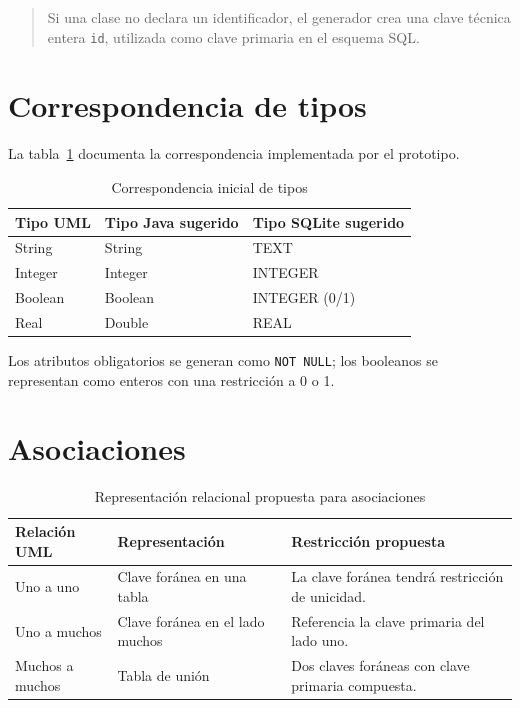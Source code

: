 \documentclass[12pt,a4paper,oneside]{report}
\begin{document}
\begin{quote}
Si una clase no declara un identificador, el generador crea una clave técnica entera \texttt{id}, utilizada como clave primaria en el esquema SQL.
\end{quote}

\section{Correspondencia de tipos}
La tabla~\ref{tab:tipos} documenta la correspondencia implementada por el prototipo.

\begin{table}[H]
\centering
\caption{Correspondencia inicial de tipos}
\label{tab:tipos}
\begin{tabular}{lll}
\toprule
\textbf{Tipo UML} & \textbf{Tipo Java sugerido} & \textbf{Tipo SQLite sugerido}\\
\midrule
String & String & TEXT\\
Integer & Integer & INTEGER\\
Boolean & Boolean & INTEGER (0/1)\\
Real & Double & REAL\\
\bottomrule
\end{tabular}
\end{table}

Los atributos obligatorios se generan como \texttt{NOT NULL}; los booleanos se representan como enteros con una restricción a 0 o 1.

\section{Asociaciones}
\begin{table}[H]
\centering
\caption{Representación relacional propuesta para asociaciones}
\label{tab:asociaciones}
\begin{tabularx}{\textwidth}{l l X}
\toprule
\textbf{Relación UML} & \textbf{Representación} & \textbf{Restricción propuesta}\\
\midrule
Uno a uno & Clave foránea en una tabla & La clave foránea tendrá restricción de unicidad.\\
Uno a muchos & Clave foránea en el lado muchos & Referencia la clave primaria del lado uno.\\
Muchos a muchos & Tabla de unión & Dos claves foráneas con clave primaria compuesta.\\
\bottomrule
\end{tabularx}
\end{table}
\end{document}
